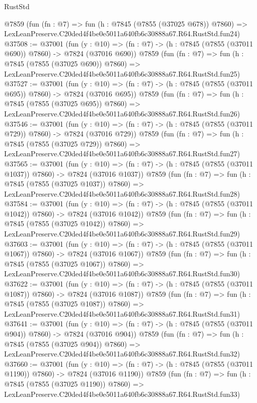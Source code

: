 \begin{lexlean}{RustStd}
\begin{coremodule}
    @7859
    (fun (fn : @7) =>
    fun (h : @7845 (@7855 (@37025 @678)) @7860) =>
    LexLeanPreserve.C20ded4f4be0e5011a640fb6c30888a67.R64.RustStd.fun24)
@37508 := @37001
    (fun (y : @10) => (fn : @7) -> (h : @7845 (@7855 (@37011 @690)) @7860) -> @7824 (@37016 @690))
    @7859
    (fun (fn : @7) =>
    fun (h : @7845 (@7855 (@37025 @690)) @7860) =>
    LexLeanPreserve.C20ded4f4be0e5011a640fb6c30888a67.R64.RustStd.fun25)
@37527 := @37001
    (fun (y : @10) => (fn : @7) -> (h : @7845 (@7855 (@37011 @695)) @7860) -> @7824 (@37016 @695))
    @7859
    (fun (fn : @7) =>
    fun (h : @7845 (@7855 (@37025 @695)) @7860) =>
    LexLeanPreserve.C20ded4f4be0e5011a640fb6c30888a67.R64.RustStd.fun26)
@37546 := @37001
    (fun (y : @10) => (fn : @7) -> (h : @7845 (@7855 (@37011 @729)) @7860) -> @7824 (@37016 @729))
    @7859
    (fun (fn : @7) =>
    fun (h : @7845 (@7855 (@37025 @729)) @7860) =>
    LexLeanPreserve.C20ded4f4be0e5011a640fb6c30888a67.R64.RustStd.fun27)
@37565 := @37001
    (fun (y : @10) => (fn : @7) -> (h : @7845 (@7855 (@37011 @1037)) @7860) -> @7824 (@37016 @1037))
    @7859
    (fun (fn : @7) =>
    fun (h : @7845 (@7855 (@37025 @1037)) @7860) =>
    LexLeanPreserve.C20ded4f4be0e5011a640fb6c30888a67.R64.RustStd.fun28)
@37584 := @37001
    (fun (y : @10) => (fn : @7) -> (h : @7845 (@7855 (@37011 @1042)) @7860) -> @7824 (@37016 @1042))
    @7859
    (fun (fn : @7) =>
    fun (h : @7845 (@7855 (@37025 @1042)) @7860) =>
    LexLeanPreserve.C20ded4f4be0e5011a640fb6c30888a67.R64.RustStd.fun29)
@37603 := @37001
    (fun (y : @10) => (fn : @7) -> (h : @7845 (@7855 (@37011 @1067)) @7860) -> @7824 (@37016 @1067))
    @7859
    (fun (fn : @7) =>
    fun (h : @7845 (@7855 (@37025 @1067)) @7860) =>
    LexLeanPreserve.C20ded4f4be0e5011a640fb6c30888a67.R64.RustStd.fun30)
@37622 := @37001
    (fun (y : @10) => (fn : @7) -> (h : @7845 (@7855 (@37011 @1087)) @7860) -> @7824 (@37016 @1087))
    @7859
    (fun (fn : @7) =>
    fun (h : @7845 (@7855 (@37025 @1087)) @7860) =>
    LexLeanPreserve.C20ded4f4be0e5011a640fb6c30888a67.R64.RustStd.fun31)
@37641 := @37001
    (fun (y : @10) => (fn : @7) -> (h : @7845 (@7855 (@37011 @904)) @7860) -> @7824 (@37016 @904))
    @7859
    (fun (fn : @7) =>
    fun (h : @7845 (@7855 (@37025 @904)) @7860) =>
    LexLeanPreserve.C20ded4f4be0e5011a640fb6c30888a67.R64.RustStd.fun32)
@37660 := @37001
    (fun (y : @10) => (fn : @7) -> (h : @7845 (@7855 (@37011 @1190)) @7860) -> @7824 (@37016 @1190))
    @7859
    (fun (fn : @7) =>
    fun (h : @7845 (@7855 (@37025 @1190)) @7860) =>
    LexLeanPreserve.C20ded4f4be0e5011a640fb6c30888a67.R64.RustStd.fun33)

\end{coremodule}
\end{lexlean}
